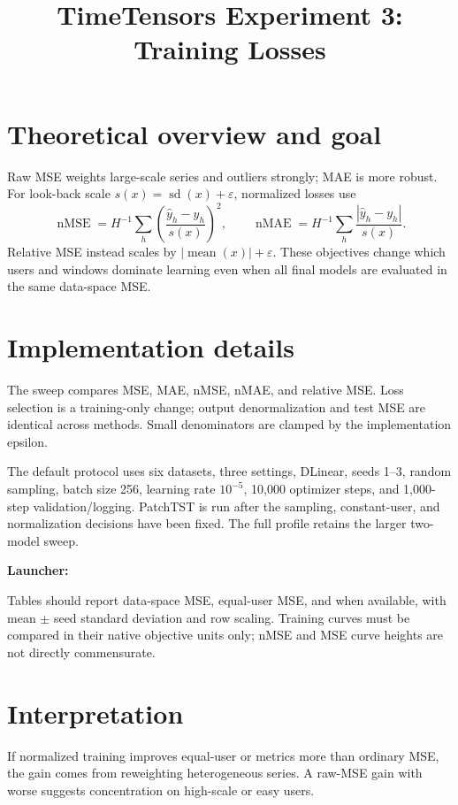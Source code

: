 \documentclass[10pt]{article}
\title{TimeTensors Experiment 3: Training Losses}
\author{}
\date{}
\begin{document}
\maketitle
\section{Theoretical overview and goal}
Raw MSE weights large-scale series and outliers strongly; MAE is more robust.
For look-back scale $s(x)=\operatorname{sd}(x)+\varepsilon$, normalized losses
use
\[
 \operatorname{nMSE}=H^{-1}\sum_h\left(\frac{\hat y_h-y_h}{s(x)}\right)^2,
 \qquad
 \operatorname{nMAE}=H^{-1}\sum_h\frac{|\hat y_h-y_h|}{s(x)}.
\]
Relative MSE instead scales by $|\operatorname{mean}(x)|+\varepsilon$.  These
objectives change which users and windows dominate learning even when all final
models are evaluated in the same data-space MSE.


\section{Implementation details}
The sweep compares MSE, MAE, nMSE, nMAE, and relative MSE.  Loss selection is a
training-only change; output denormalization and test MSE are identical across
methods.  Small denominators are clamped by the implementation epsilon.

The default protocol uses six datasets, three settings, DLinear, seeds 1--3,
random sampling, batch size 256, learning rate $10^{-5}$, 10,000 optimizer
steps, and 1,000-step validation/logging. PatchTST is run after the sampling,
constant-user, and normalization decisions have been fixed. The full profile
retains the larger two-model sweep.

\textbf{Launcher:} 

Tables should report data-space MSE, equal-user MSE, and \Wten{} when available,
with mean $\pm$ seed standard deviation and row scaling.  Training curves must
be compared in their native objective units only; nMSE and MSE curve heights
are not directly commensurate.

\section{Interpretation}
If normalized training improves equal-user or \Wten{} metrics more than ordinary
MSE, the gain comes from reweighting heterogeneous series.  A raw-MSE gain with
worse \Wten{} suggests concentration on high-scale or easy users.
\end{document}
